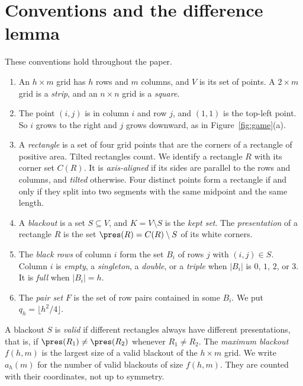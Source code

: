 \section{Conventions and the difference lemma}\label{sec:conv}

These conventions hold throughout the paper.
\begin{enumerate}[(1),leftmargin=*]
\item An $h\times m$ grid has $h$ rows and $m$ columns, and $V$ is its set of points.
A $2\times m$ grid is a \emph{strip}, and an $n\times n$ grid is a \emph{square}.
\item The point $(i,j)$ is in column $i$ and row $j$, and $(1,1)$ is the top-left
point. So $i$ grows to the right and $j$ grows downward, as in
Figure~\ref{fig:game}(a).
\item A \emph{rectangle} is a set of four grid points that are the corners of a
rectangle of positive area. Tilted rectangles count. We identify a rectangle $R$ with
its corner set $C(R)$. It is
\emph{axis-aligned} if its sides are parallel to the rows and columns, and
\emph{tilted} otherwise. Four distinct points form a rectangle if and only if they
split into two segments with the same midpoint and the same length.
\item A \emph{blackout} is a set $S\subseteq V$, and $K=V\setminus S$ is the
\emph{kept set}. The \emph{presentation} of a rectangle $R$ is the set
$\pres(R)=C(R)\setminus S$ of its white corners.
\item The \emph{black rows} of column $i$ form the set $B_i$ of rows $j$ with
$(i,j)\in S$. Column $i$ is \emph{empty}, a \emph{singleton}, a \emph{double}, or a
\emph{triple} when $|B_i|$ is $0$, $1$, $2$, or $3$. It is \emph{full} when $|B_i|=h$.
\item The \emph{pair set} $F$ is the set of row pairs contained in some $B_i$. We put
$q_h=\lfloor h^2/4\rfloor$.
\end{enumerate}

\begin{definition}\label{def:valid}
A blackout $S$ is \emph{valid} if different rectangles always have different
presentations, that is, if $\pres(R_1)\ne\pres(R_2)$ whenever $R_1\ne R_2$. The
\emph{maximum blackout} $f(h,m)$ is the largest size of a valid blackout of the
$h\times m$ grid. We write $a_h(m)$ for the number of valid blackouts of size $f(h,m)$.
They are counted with their coordinates, not up to symmetry.
\end{definition}


